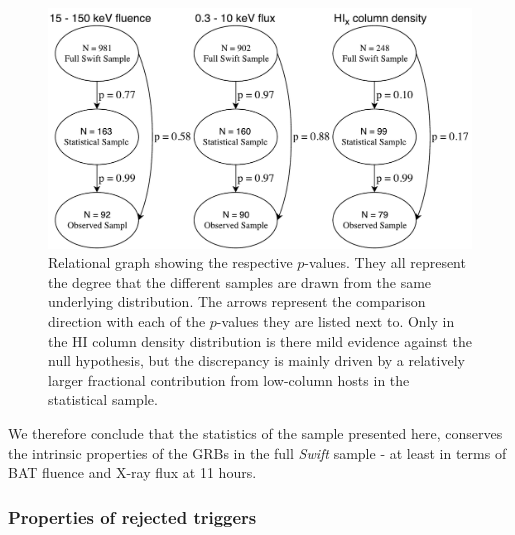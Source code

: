 \documentclass[longauth]{aa}    %
\begin{document}
\begin{figure}[!ht]
	\centerline{\includegraphics[width=\columnwidth]{figures/XSGRB_p_values.pdf}}
\caption{Relational graph showing the respective $p$-values. They all represent
	the degree that the different samples are drawn from the same underlying
	distribution. The arrows represent the comparison direction with each of the
	$p$-values they are listed next to. Only in the H{\sc I} column density distribution is
	there mild evidence against the null hypothesis, but the discrepancy is mainly
	driven by a relatively larger fractional contribution from low-column hosts in
	the statistical sample.} \label{fig:p_values}
\end{figure}

We therefore conclude that the statistics of the sample presented here,
conserves the intrinsic properties of the GRBs in the full \textit{Swift} sample
- at least in terms of BAT fluence and X-ray flux at 11 hours.




\subsubsection{Properties of rejected triggers} \label{badbursts}
\end{document}
